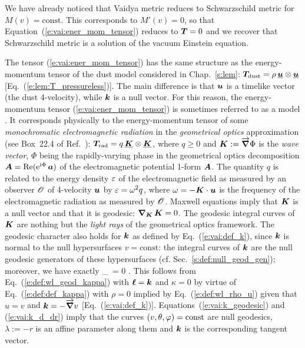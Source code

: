 \begin{remark}
We have already noticed that Vaidya metric reduces to Schwarzschild metric for $M(v) = \mathrm{const}$.
This corresponds to $M'(v) = 0$, so that
Equation~(\ref{e:vai:ener_mom_tensor}) reduces to $\bm{T} = 0$ and we recover that
Schwarzschild metric is a solution of the vacuum Einstein equation.
\end{remark}

The tensor (\ref{e:vai:ener_mom_tensor}) has the same
structure as the energy-momentum tensor of the dust model considered in Chap.~\ref{s:lem}:
$\bm{T}_{\rm dust} = \rho  \, \underline{\bm{u}} \otimes \underline{\bm{u}} $ [Eq.~(\ref{e:lem:T_pressureless})].
The main difference is that $\bm{u}$ is a timelike vector (the dust 4-velocity), while
$\bm{k}$ is a null vector. For this reason, the energy-momentum tensor  (\ref{e:vai:ener_mom_tensor})
is sometimes referred to as a  model \cite{Poiss04}.
It corresponds physically to the energy-momentum tensor of some \emph{monochromatic electromagnetic radiation} in the
\emph{geometrical optics} approximation (see Box~22.4 of Ref.~\cite{MisneTW73}):
$\bm{T}_{\rm rad} = q  \, \underline{\bm{K}} \otimes \underline{\bm{K}}$, where $q\geq 0$ and $\bm{K} := \overrightarrow{\bm{\nabla}}\Phi$ is the \emph{wave vector}, $\Phi$ being the rapidly-varying
phase in the geometrical optics decomposition $\bm{A} = \mathrm{Re}(\mathrm{e}^{\mathrm{i}\Phi} \, \bm{a})$ of the electromagnetic potential 1-form $\bm{A}$. The quantity $q$ is related to the energy density
$\varepsilon$ of the electromagnetic field as measured by an observer $\mathscr{O}$ of 4-velocity $\bm{u}$
by $\varepsilon = \omega^2 q$, where $\omega = - \bm{K}\cdot\bm{u}$ is the frequency of the electromagnetic
radiation as measured by $\mathscr{O}$.
Maxwell equations imply that $\bm{K}$ is a null vector and that it is geodesic:
$\bm{\nabla}_{\bm{K}}\, \bm{K} = 0$. The geodesic integral curves of $\bm{K}$ are nothing but
the \emph{light rays} of the geometrical optics framework.
The geodesic character also holds for $\bm{k}$ as defined by Eq.~(\ref{e:vai:def_k}),
since $\bm{k}$ is normal to the null hypersurfaces $v = \mathrm{const}$:
the integral curves of $\bm{k}$ are the null geodesic generators of these hypersurfaces
(cf. Sec.~\ref{s:def:null_geod_gen}); moreover,
we have exactly
\be \label{e:vai:k_geodesic}
    \w{\nabla}_{}\,  = 0 .
\ee
This follows from Eq.~(\ref{e:def:wl_geod_kappa}) with $\bm{\ell} = \bm{k}$ and $\kappa = 0$
by virtue of Eq.~(\ref{e:def:def_kappa}) with $\rho=0$ implied by
Eq.~(\ref{e:def:wl_rho_u}) given that $u = v$ and $\bm{k} =  - \overrightarrow{\bm{\nabla}} v$ [Eq.~(\ref{e:vai:def_k})].
Equations~(\ref{e:vai:k_geodesic}) and (\ref{e:vai:k_d_dr})
imply that the curves $(v,\theta,\varphi) = \mathrm{const}$
are null geodesics, $\lambda:=-r$ is an affine parameter along them and $\bm{k}$ is
the corresponding tangent vector.

